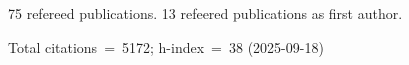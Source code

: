 75 refereed publications. 13 refeered publications as first author.

Total citations~=~5172; h-index~=~38 (2025-09-18)